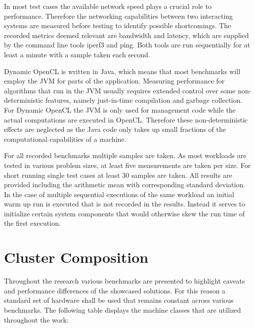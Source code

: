 In most test cases the available network speed plays a crucial role to performance. Therefore the networking capabilities between two interacting systems are measured before testing to identify possible shortcomings. The recorded metrics deemed relevant are bandwidth and latency, which are supplied by the command line tools iperf3 and ping. Both tools are run sequentially for at least a minute with a sample taken each second.

Dynamic OpenCL is written in Java, which means that most benchmarks will employ the JVM for parts of the application. Measuring performance for algorithms that run in the JVM usually requires extended control over some non-deterministic features, namely just-in-time compilation and garbage collection\cite{rigorous_java}. For Dynamic OpenCL the JVM is only used for management code while the actual computations are executed in OpenCL. Therefore these non-deterministic effects are neglected as the Java code only takes up small fractions of the computational capabilities of a machine.

For all recorded benchmarks multiple samples are taken. As most workloads are tested in various problem sizes, at least five measurements are taken per size. For short running single test cases at least 30 samples are taken. All results are provided including the arithmetic mean with corresponding standard deviation. In the case of multiple sequential executions of the same workload an initial warm up run is executed that is not recorded in the results. Instead it serves to initialize certain system components that would otherwise skew the run time of the first execution.

\section{Cluster Composition}
\label{cluster_composition}
Throughout the research various benchmarks are presented to highlight caveats and performance differences of the showcased solutions. For this reason a standard set of hardware shall be used that remains constant across various benchmarks. The following table displays the machine classes that are utilized throughout the work:

